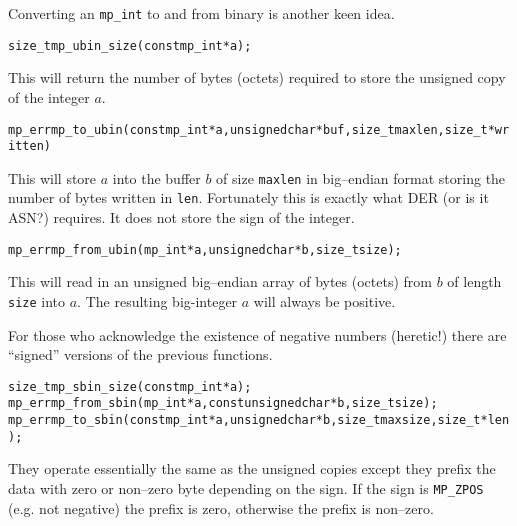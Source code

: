 \documentclass[synpaper]{book}
\begin{document}
Converting an \texttt{mp\_int} to and from binary is another keen idea.

\begin{alltt}
size_t mp_ubin_size(const mp_int *a);
\end{alltt}

This will return the number of bytes (octets) required to store the unsigned copy of the integer $a$.

\begin{alltt}
mp_err mp_to_ubin(const mp_int *a, unsigned char *buf, size_t maxlen, size_t *written)
\end{alltt}
This will store $a$ into the buffer $b$ of size \texttt{maxlen} in big--endian format storing the number of bytes written in \texttt{len}.  Fortunately this is exactly what DER (or is it ASN?) requires.  It does not store the sign of the integer.

\begin{alltt}
mp_err mp_from_ubin(mp_int *a, unsigned char *b, size_t size);
\end{alltt}
This will read in an unsigned big--endian array of bytes (octets) from $b$ of length \texttt{size} into $a$.  The resulting big-integer $a$ will always be positive.

For those who acknowledge the existence of negative numbers (heretic!) there are ``signed'' versions of the
previous functions.
  
\begin{alltt}
size_t mp_sbin_size(const mp_int *a);
mp_err mp_from_sbin(mp_int *a, const unsigned char *b, size_t size);
mp_err mp_to_sbin(const mp_int *a, unsigned char *b, size_t maxsize, size_t *len);
\end{alltt}
They operate essentially the same as the unsigned copies except they prefix the data with zero or non--zero
byte depending on the sign.  If the sign is \texttt{MP\_ZPOS} (e.g. not negative) the prefix is zero, otherwise the prefix
is non--zero.
\end{document}
